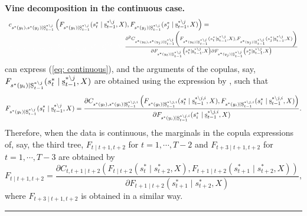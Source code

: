\documentclass[harvard,11pt]{article}
\newenvironment{proof}[1][Proof]{\textbf{#1.} }{\  \rule{0.5em}{0.5em}}
\begin{document}
\begin{proof}[Vine decomposition in the continuous case]
\allowdisplaybreaks
\begin{align}
\begin{split}
\begin{array}{l}
c_{s^*(y_t),s^*(y_j)\mid \text{\b{S}}_{t-1}^{*\backslash j}}\left(F_{s^*(y_t)\mid\text{\b{S}}_{t-1}^{*\backslash j}}(s_t^*\mid \text{\b{s}}_{t-1}^{*\backslash j},X),F_{s^*(y_j)\mid\text{\b{S}}_{t-1}^{*\backslash j}}(s_j^*\mid \text{\b{s}}_{t-1}^{*\backslash j},X) \right)=\\
\textcolor{white}{c_{s^*(y_t),s^*(y_j)\mid \text{\b{S}}_{t-1}^{*\backslash j}}(F_{s^*(y_t)\mid\text{\b{S}}_{t-1}^{*\backslash j}}(s_t^*\mid \text{\b{s}}_{t-1}^{*\backslash j},X)}\frac{\partial^2C_{s^*(y_t),s^*(y_j)\mid \text{\b{S}}_{t-1}^{*\backslash j}}\left(F_{s^*(y_t)\mid\text{\b{S}}_{t-1}^{*\backslash j}}(s_t^*\mid \text{\b{s}}_{t-1}^{*\backslash j},X),F_{s^*(y_j)\mid\text{\b{S}}_{t-1}^{*\backslash j}}(s_j^*\mid \text{\b{s}}_{t-1}^{*\backslash j},X) \right)}{\partial F_{s^*(y_t)\mid\text{\b{S}}_{t-1}^{*\backslash j}}\left(s_t^*\mid \text{\b{s}}_{t-1}^{*\backslash j},X\right)\partial F_{s^*(y_j)\mid\text{\b{S}}_{t-1}^{*\backslash j}}\left(s_j^*\mid \text{\b{s}}_{t-1}^{*\backslash j},X\right)}
\end{array}
\end{split}
\end{align}
\endgroup
 can express (\ref{eq: continuous}), and the arguments of the copulas, say, $F_{s^*(y_t)\mid\text{\b{S}}_{t-1}^{*\backslash j}}(s_t^*\mid \text{\b{s}}_{t-1}^{*\backslash j},X)$ are obtained using the expression by \citet{joe1996families}, such that
\begin{equation}
F_{s^*(y_t)\mid\text{\b{S}}_{t-1}^{*\backslash j}}(s_t^*\mid \text{\b{s}}_{t-1}^{*\backslash j},X)=\frac{\partial C_{s^*(y_t),s^*(y_i)\mid \text{\b{S}}_{t-1}^{*\backslash j,i}}\left(F_{s^*(y_t)\mid\text{\b{S}}_{t-1}^{*\backslash j,i}}(s_t^*\mid \text{\b{s}}_{t-1}^{*\backslash j,i},X),F_{s^*(y_i)\mid\text{\b{S}}_{t-1}^{*\backslash j,i}}(s_i^*\mid \text{\b{s}}_{t-1}^{*\backslash j,i},X)\right)}{\partial F_{s^*(y_i)\mid\text{\b{S}}_{t-1}^{*\backslash j,i}}(s_i^*\mid \text{\b{s}}_{t-1}^{*\backslash j,i},X)}.
\end{equation}
Therefore, when the data is continuous, the marginals in the copula expressions of, say, the third tree, $F_{t\mid t+1,t+2}$ for $t=1,\cdots,T-2$ and $F_{t+3\mid t+1,t+2}$ for $t=1,\cdots,T-3$ are obtained by 
\begin{equation}
F_{t\mid t+1,t+2}=\frac{\partial C_{t,t+1\mid t+2}(F_{t\mid t+2}(s_t^*\mid s_{t+2}^*,X),F_{t+1\mid t+2}(s_{t+1}^*\mid s_{t+2}^*,X))}{\partial F_{t+1\mid t+2}(s_{t+1}^*\mid s_{t+2}^*,X)},
\end{equation}
where $F_{t+3\mid t+1,t+2}$ is obtained in a similar way.
\end{proof}
\end{document}
